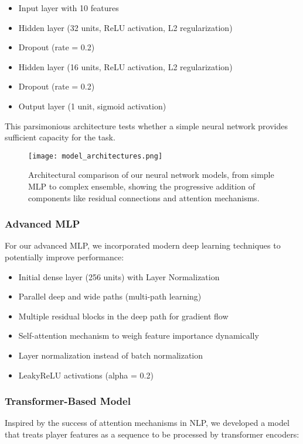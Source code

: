 \documentclass[10pt,twocolumn,letterpaper]{article}
\begin{document}
\begin{itemize}
    \item Input layer with 10 features
    \item Hidden layer (32 units, ReLU activation, L2 regularization)
    \item Dropout (rate = 0.2)
    \item Hidden layer (16 units, ReLU activation, L2 regularization)
    \item Dropout (rate = 0.2)
    \item Output layer (1 unit, sigmoid activation)
\end{itemize}

This parsimonious architecture tests whether a simple neural network provides sufficient capacity for the task.

\begin{figure}[t]
\begin{center}
\texttt{[image: model\_architectures.png]}
\end{center}
   \caption{Architectural comparison of our neural network models, from simple MLP to complex ensemble, showing the progressive addition of components like residual connections and attention mechanisms.}
\label{fig:model_comparison}
\end{figure}

\subsubsection{Advanced MLP}
For our advanced MLP, we incorporated modern deep learning techniques to potentially improve performance:

\begin{itemize}
    \item Initial dense layer (256 units) with Layer Normalization
    \item Parallel deep and wide paths (multi-path learning)
    \item Multiple residual blocks in the deep path for gradient flow
    \item Self-attention mechanism to weigh feature importance dynamically
    \item Layer normalization instead of batch normalization
    \item LeakyReLU activations (alpha = 0.2)
\end{itemize}

\subsubsection{Transformer-Based Model}
Inspired by the success of attention mechanisms in NLP, we developed a model that treats player features as a sequence to be processed by transformer encoders:
\end{document}
